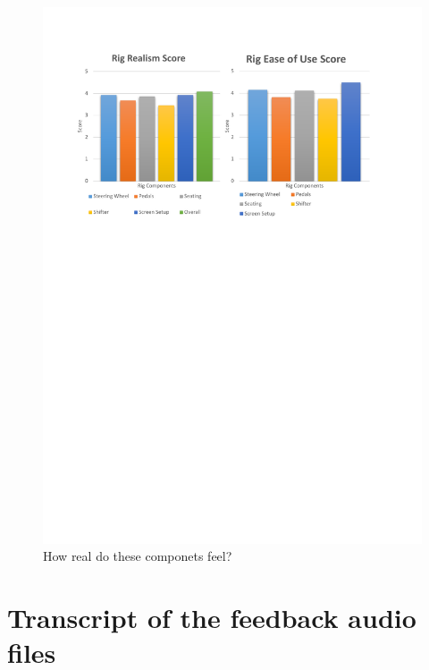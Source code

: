 \begin{figure}[!htb]
	\centering
	\includegraphics[width=\textwidth]{charts/realistic.pdf}
	\caption[Participants rig realisim score]{How real do these componets feel?}
\label{fig:chart-realistic}
\end{figure}
%
%
%
%
%

\section{Transcript of the feedback audio files}

